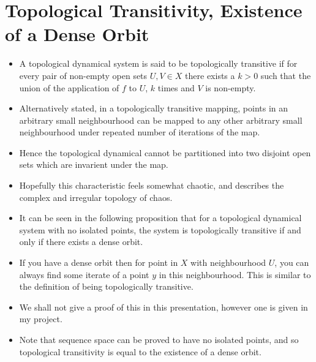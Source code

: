 \documentclass{article}
\begin{document}
    \section{Topological Transitivity, Existence of a Dense Orbit}
    \begin{itemize}
        \item A topological dynamical system is said to be topologically transitive if for every pair of non-empty open sets $U, V \in X$ there exists a $k > 0$ such that the union of the application of $f$ to $U$, $k$ times and $V$ is non-empty.
        \item Alternatively stated, in a topologically transitive mapping, points in an arbitrary small neighbourhood can be mapped to any other arbitrary small neighbourhood under repeated number of iterations of the map.
        \item Hence the topological dynamical cannot be partitioned into two disjoint open sets which are invarient under the map.
        \item Hopefully this characteristic feels somewhat chaotic, and describes the complex and irregular topology of chaos.
        \item It can be seen in the following proposition that for a topological dynamical system with no isolated points, the system is topologically transitive if and only if there exists a dense orbit.
        \item If you have a dense orbit then for point in $X$ with neighbourhood $U$, you can always find some iterate of a point $y$ in this neighbourhood. This is similar to the definition of being topologically transitive.
        \item We shall not give a proof of this in this presentation, however one is given in my project.
        \item Note that sequence space can be proved to have no isolated points, and so topological transitivity is equal to the existence of a dense orbit.
    \end{itemize}    
\end{document}
